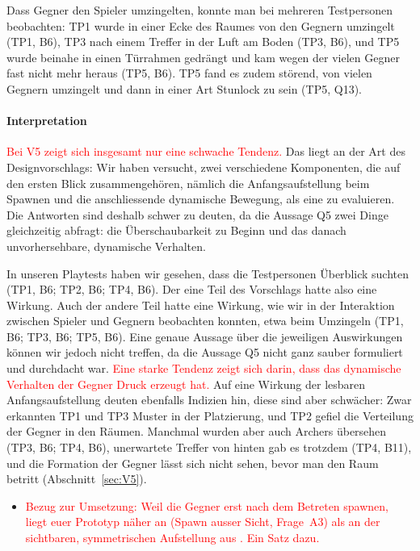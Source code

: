 \documentclass[../Main.tex]{subfiles}
\begin{document}
Dass Gegner den Spieler umzingelten, konnte man bei mehreren Testpersonen beobachten: TP1 wurde in einer Ecke des Raumes von den Gegnern umzingelt (TP1, B6), TP3 nach einem Treffer in der Luft am Boden (TP3, B6), und TP5 wurde beinahe in einen Türrahmen gedrängt und kam wegen der vielen Gegner fast nicht mehr heraus (TP5, B6). TP5 fand es zudem störend, von vielen Gegnern umzingelt und dann in einer Art Stunlock zu sein (TP5, Q13).

\paragraph{Interpretation}
\textcolor{red}{Bei V5 zeigt sich insgesamt nur eine schwache Tendenz.} Das liegt an der Art des Designvorschlags: Wir haben versucht, zwei verschiedene Komponenten, die auf den ersten Blick zusammengehören, nämlich die Anfangsaufstellung beim Spawnen und die anschliessende dynamische Bewegung, als eine zu evaluieren. Die Antworten sind deshalb schwer zu deuten, da die Aussage Q5 zwei Dinge gleichzeitig abfragt: die Überschaubarkeit zu Beginn und das danach unvorhersehbare, dynamische Verhalten.

In unseren Playtests haben wir gesehen, dass die Testpersonen Überblick suchten (TP1, B6; TP2, B6; TP4, B6). Der eine Teil des Vorschlags hatte also eine Wirkung. Auch der andere Teil hatte eine Wirkung, wie wir in der Interaktion zwischen Spieler und Gegnern beobachten konnten, etwa beim Umzingeln (TP1, B6; TP3, B6; TP5, B6). Eine genaue Aussage über die jeweiligen Auswirkungen können wir jedoch nicht treffen, da die Aussage Q5 nicht ganz sauber formuliert und durchdacht war. \textcolor{red}{Eine starke Tendenz zeigt sich darin, dass das dynamische Verhalten der Gegner Druck erzeugt hat.} Auf eine Wirkung der lesbaren Anfangsaufstellung deuten ebenfalls Indizien hin, diese sind aber schwächer: Zwar erkannten TP1 und TP3 Muster in der Platzierung, und TP2 gefiel die Verteilung der Gegner in den Räumen. Manchmal wurden aber auch Archers übersehen (TP3, B6; TP4, B6), unerwartete Treffer von hinten gab es trotzdem (TP4, B11), und die Formation der Gegner lässt sich nicht sehen, bevor man den Raum betritt (Abschnitt~\ref{sec:V5}).

\begin{itemize}[leftmargin=1.5cm]
    \item \textcolor{red}{Bezug zur Umsetzung: Weil die Gegner erst nach dem Betreten spawnen, liegt euer Prototyp näher an  (Spawn ausser Sicht, Frage~A3) als an der sichtbaren, symmetrischen Aufstellung aus . Ein Satz dazu.}
\end{itemize}
\end{document}
